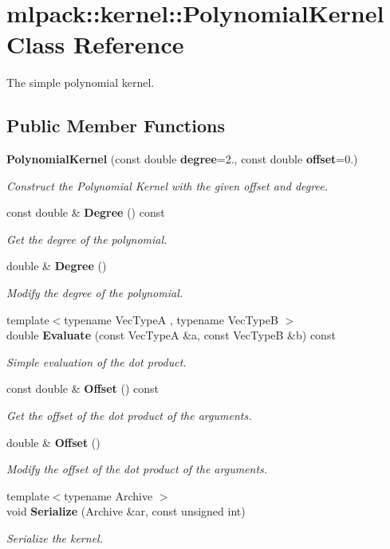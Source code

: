 \section{mlpack\+:\+:kernel\+:\+:Polynomial\+Kernel Class Reference}
\label{classmlpack_1_1kernel_1_1PolynomialKernel}


The simple polynomial kernel.  


\subsection*{Public Member Functions}
\begin{DoxyCompactItemize}
\item 
{\bf Polynomial\+Kernel} (const double {\bf degree}=2., const double {\bf offset}=0.)
\begin{DoxyCompactList}\small\item\em Construct the Polynomial Kernel with the given offset and degree. \end{DoxyCompactList}\item 
const double \& {\bf Degree} () const 
\begin{DoxyCompactList}\small\item\em Get the degree of the polynomial. \end{DoxyCompactList}\item 
double \& {\bf Degree} ()
\begin{DoxyCompactList}\small\item\em Modify the degree of the polynomial. \end{DoxyCompactList}\item 
{\footnotesize template$<$typename Vec\+TypeA , typename Vec\+TypeB $>$ }\\double {\bf Evaluate} (const Vec\+TypeA \&a, const Vec\+TypeB \&b) const 
\begin{DoxyCompactList}\small\item\em Simple evaluation of the dot product. \end{DoxyCompactList}\item 
const double \& {\bf Offset} () const 
\begin{DoxyCompactList}\small\item\em Get the offset of the dot product of the arguments. \end{DoxyCompactList}\item 
double \& {\bf Offset} ()
\begin{DoxyCompactList}\small\item\em Modify the offset of the dot product of the arguments. \end{DoxyCompactList}\item 
{\footnotesize template$<$typename Archive $>$ }\\void {\bf Serialize} (Archive \&ar, const unsigned int)
\begin{DoxyCompactList}\small\item\em Serialize the kernel. \end{DoxyCompactList}\end{DoxyCompactItemize}
